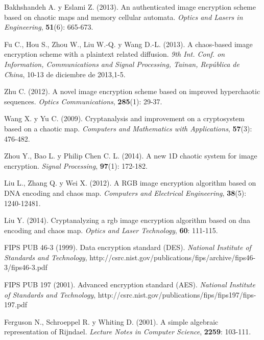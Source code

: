 \begin{thebibliography}{00}
Bakhshandeh A. y Eslami Z. (2013).
\newblock An authenticated image encryption scheme based on chaotic maps and memory cellular automata.
\newblock \emph{Optics and Lasers in Engineering}, \textbf{51}(6): 665-673.

Fu C., Hou S., Zhou W., Liu W.-Q. y Wang D.-L. (2013).
\newblock A chaos-based image encryption scheme with a plaintext related diffusion.
\newblock \emph{9th Int. Conf. on Information, Communications and Signal Processing, Tainan, República de China}, 10-13 de diciembre de 2013,1-5.

Zhu C. (2012).
\newblock A novel image encryption scheme based on improved hyperchaotic sequences.
\newblock \emph{Optics Communications}, \textbf{285}(1): 29-37.

Wang X. y Yu C. (2009).
\newblock Cryptanalysis and improvement on a cryptosystem based on a chaotic map.
\newblock \emph{Computers and Mathematics with Applications}, \textbf{57}(3): 476-482.

Zhou Y., Bao L. y Philip Chen C. L. (2014).
\newblock A new 1D chaotic system for image encryption.
\newblock \emph{Signal Processing}, \textbf{97}(1): 172-182.

Liu L., Zhang Q. y Wei X. (2012).
\newblock A RGB image encryption algorithm based on DNA encoding and chaos map.
\newblock \emph{Computers and Electrical Engineering}, \textbf{38}(5): 1240-12481.

Liu Y. (2014).
\newblock Cryptanalyzing a rgb image encryption algorithm based on dna encoding and chaos map.
\newblock \emph{Optics and Laser Technology}, \textbf{60}: 111-115.

FIPS PUB 46-3 (1999).
\newblock Data encryption standard (DES).
\newblock \emph{National Institute of Standards and Technology}, http://csrc.nist.gov/publications/fips/archive/fips46-3/fips46-3.pdf

FIPS PUB 197 (2001).
\newblock Advanced encryption standard (AES).
\newblock \emph{National Institute of Standards and Technology}, http://csrc.nist.gov/publications/fips/fips197/fips-197.pdf

Ferguson N., Schroeppel R. y Whiting D. (2001).
\newblock A simple algebraic representation of Rijndael.
\newblock \emph{Lecture Notes in Computer Science}, \textbf{2259}: 103-111.


\end{thebibliography}
